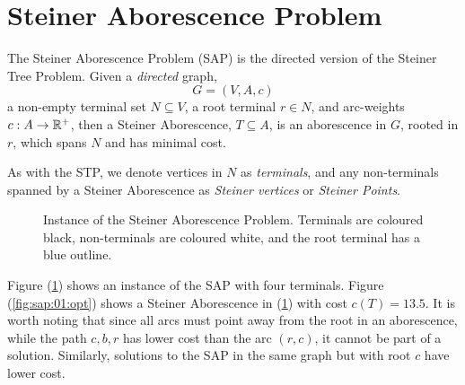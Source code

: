 \section{Steiner Aborescence Problem}
The Steiner Aborescence Problem (SAP) is the directed version of the Steiner Tree Problem.
Given a \textit{directed} graph,
$$G = (V, A, c)$$
a non-empty terminal set $N \subseteq V$, a root terminal $r \in N$, and arc-weights $c : A \to \mathbb{R}^+$,
then a Steiner Aborescence, $T \subseteq A$, is an aborescence
in $G$, rooted in $r$, which spans $N$ and has minimal cost.

As with the STP, we denote vertices in $N$ as \textit{terminals}, and any non-terminals spanned by a Steiner Aborescence as
 \textit{Steiner vertices} or \textit{Steiner Points}.
\begin{figure}[h]\centering
{}
\caption{Instance of the Steiner Aborescence Problem. Terminals are coloured black, non-terminals are coloured white, and the root terminal
  has a blue outline.}
\label{fig:sap:01}
\end{figure}

Figure (\ref{fig:sap:01}) shows an instance of the SAP with four terminals. Figure (\ref{fig:sap:01:opt}) shows a Steiner Aborescence in (\ref{fig:sap:01})
with cost $c(T) = 13.5$. It is worth noting that since all arcs must point away from the root in an aborescence, while the path $c, b, r$  has
 lower cost than the arc $(r, c)$, it cannot be part of a solution. Similarly, solutions to the SAP in the same graph but with root $c$ have lower cost.

